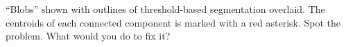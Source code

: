 \label{fig:blobs_summed_centroids} ``Blobs'' shown with outlines of threshold-based segmentation overlaid. The centroids of each connected component is marked with a red asterisk. Spot the problem. What would you do to fix it?